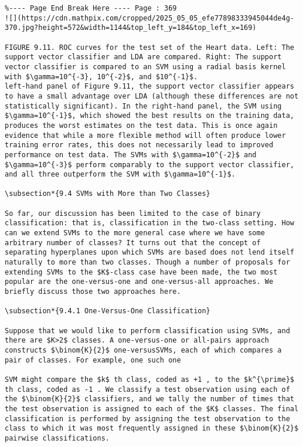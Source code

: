 \documentclass[10pt]{article}
\begin{document}
\begin{verbatim}
%---- Page End Break Here ---- Page : 369
![](https://cdn.mathpix.com/cropped/2025_05_05_efe77898333945044de4g-370.jpg?height=572&width=1144&top_left_y=184&top_left_x=169)

FIGURE 9.11. ROC curves for the test set of the Heart data. Left: The support vector classifier and LDA are compared. Right: The support vector classifier is compared to an SVM using a radial basis kernel with $\gamma=10^{-3}, 10^{-2}$, and $10^{-1}$.
left-hand panel of Figure 9.11, the support vector classifier appears to have a small advantage over LDA (although these differences are not statistically significant). In the right-hand panel, the SVM using $\gamma=10^{-1}$, which showed the best results on the training data, produces the worst estimates on the test data. This is once again evidence that while a more flexible method will often produce lower training error rates, this does not necessarily lead to improved performance on test data. The SVMs with $\gamma=10^{-2}$ and $\gamma=10^{-3}$ perform comparably to the support vector classifier, and all three outperform the SVM with $\gamma=10^{-1}$.

\subsection*{9.4 SVMs with More than Two Classes}

So far, our discussion has been limited to the case of binary classification: that is, classification in the two-class setting. How can we extend SVMs to the more general case where we have some arbitrary number of classes? It turns out that the concept of separating hyperplanes upon which SVMs are based does not lend itself naturally to more than two classes. Though a number of proposals for extending SVMs to the $K$-class case have been made, the two most popular are the one-versus-one and one-versus-all approaches. We briefly discuss those two approaches here.

\subsection*{9.4.1 One-Versus-One Classification}

Suppose that we would like to perform classification using SVMs, and there are $K>2$ classes. A one-versus-one or all-pairs approach constructs $\binom{K}{2}$ one-versusSVMs, each of which compares a pair of classes. For example, one such one

SVM might compare the $k$ th class, coded as +1 , to the $k^{\prime}$ th class, coded as -1 . We classify a test observation using each of the $\binom{K}{2}$ classifiers, and we tally the number of times that the test observation is assigned to each of the $K$ classes. The final classification is performed by assigning the test observation to the class to which it was most frequently assigned in these $\binom{K}{2}$ pairwise classifications.


\end{verbatim}
\end{document}
